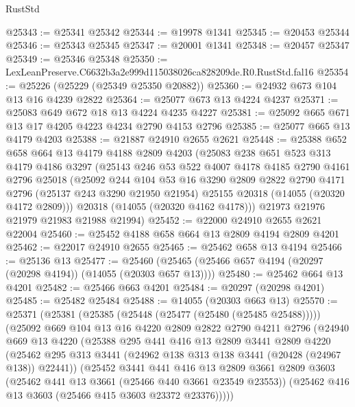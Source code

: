 \begin{lexlean}{RustStd}
\begin{coremodule}
@25343 := @25341 @25342
@25344 := @19978 @1341
@25345 := @20453 @25344
@25346 := @25343 @25345
@25347 := @20001 @1341
@25348 := @20457 @25347
@25349 := @25346 @25348
@25350 := LexLeanPreserve.C6632b3a2e999d115038026ca828209de.R0.RustStd.fal16
@25354 := @25226 (@25229 (@25349 @25350 @20882))
@25360 := @24932 @673 @104 @13 @16 @4239 @2822
@25364 := @25077 @673 @13 @4224 @4237
@25371 := @25083 @649 @672 @18 @13 @4224 @4235 @4227
@25381 := @25092 @665 @671 @13 @17 @4205 @4223 @4234 @2790 @4153 @2796
@25385 := @25077 @665 @13 @4179 @4203
@25388 := @21887 @24910 @2655 @2621
@25448 := @25388
    @652
    @658
    @664
    @13
    @4179
    @4188
    @2809
    @4203
    (@25083
      @238
      @651
      @523
      @313
      @4179
      @4186
      @3297
      (@25143
        @246
        @53
        @522
        @4007
        @4178
        @4185
        @2790
        @4161
        @2796
        @25018
        (@25092
          @244
          @104
          @53
          @16
          @3290
          @2809
          @2822
          @2790
          @4171
          @2796
          (@25137 @243 @3290 @21950 @21954)
          @25155
          @20318
          (@14055 (@20320 @4172 @2809)))
        @20318
        (@14055 (@20320 @4162 @4178)))
      @21973
      @21976
      @21979
      @21983
      @21988
      @21994)
@25452 := @22000 @24910 @2655 @2621 @22004
@25460 := @25452 @4188 @658 @664 @13 @2809 @4194 @2809 @4201
@25462 := @22017 @24910 @2655
@25465 := @25462 @658 @13 @4194
@25466 := @25136 @13
@25477 := @25460 (@25465 (@25466 @657 @4194 (@20297 (@20298 @4194)) (@14055 (@20303 @657 @13))))
@25480 := @25462 @664 @13 @4201
@25482 := @25466 @663 @4201
@25484 := @20297 (@20298 @4201)
@25485 := @25482 @25484
@25488 := @14055 (@20303 @663 @13)
@25570 := @25371
    (@25381
      (@25385 (@25448 (@25477 (@25480 (@25485 @25488)))))
      (@25092
        @669
        @104
        @13
        @16
        @4220
        @2809
        @2822
        @2790
        @4211
        @2796
        (@24940
          @669
          @13
          @4220
          (@25388
            @295
            @441
            @416
            @13
            @2809
            @3441
            @2809
            @4220
            (@25462 @295 @313 @3441 (@24962 @138 @313 @138 @3441 (@20428 (@24967 @138)) @22441))
            (@25452
              @3441
              @441
              @416
              @13
              @2809
              @3661
              @2809
              @3603
              (@25462 @441 @13 @3661 (@25466 @440 @3661 @23549 @23553))
              (@25462 @416 @13 @3603 (@25466 @415 @3603 @23372 @23376)))))

\end{coremodule}
\end{lexlean}
